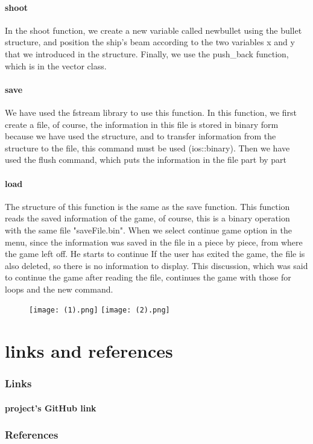 \documentclass[12pt,a4paper]{article}
\begin{document}
	\subsection{shoot}
	In the shoot function, we create a new variable called newbullet using the bullet structure, 
	and position the ship's beam according to the two variables x and y that we introduced in the structure.
	 Finally, we use the push_back function, which is in the vector class.
	\subsection{save}
	We have used the fstream library to use this function.
    In this function, we first create a file, of course, the information in this file is stored in binary form because we have used the structure, and to transfer information from the structure to the file, this command must be used (ios::binary).
    Then we have used the flush command, which puts the information in the file part by part
	\subsection{load}
    The structure of this function is the same as the save function. This function reads the saved information of the game, of course, this is a binary operation with the same file "saveFile.bin".
    When we select continue game option in the menu, since the information was saved in the file in a piece by piece, from where the game left off.
    He starts to continue
    If the user has exited the game, the file is also deleted, so there is no information to display.
    This discussion, which was said to continue the game after reading the file, continues the game with those for loops and the new command.
	\newpage
	\begin{figure}
	\texttt{[image: (1).png]}
	\texttt{[image: (2).png]}
	\end{figure}
	\newpage
	\setcounter{section}{0}
	\part{links and references}\label{linkAndRef}
	
	\section{Links}\label{linkAndRef.links}
	\subsection*{project's GitHub link}
	\href{https://github.com/Matin0789/FinalFight.git}{\color{blue}{https://github.com/Matin0789/FinalFight.git}}
	
	
	\section{References}\label{linkAndRef.ref}
	 \href{https://www.geeksforgeeks.org/c-plus-plus/}{\color{blue}{https://www.geeksforgeeks.org/c-plus-plus/}}
	 \href{https://www.programiz.com/cpp-programming}{\color{blue}{https://www.programiz.com/cpp-programming}}
\end{document}
